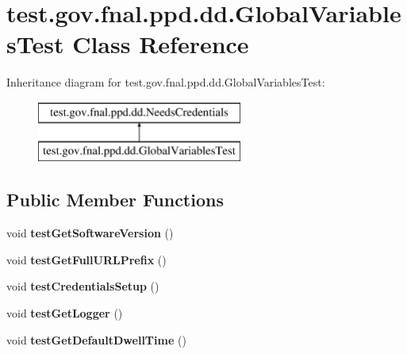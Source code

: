 \hypertarget{classtest_1_1gov_1_1fnal_1_1ppd_1_1dd_1_1GlobalVariablesTest}{\section{test.\-gov.\-fnal.\-ppd.\-dd.\-Global\-Variables\-Test Class Reference}
\label{classtest_1_1gov_1_1fnal_1_1ppd_1_1dd_1_1GlobalVariablesTest}
}
Inheritance diagram for test.\-gov.\-fnal.\-ppd.\-dd.\-Global\-Variables\-Test\-:\begin{figure}[H]
\begin{center}
\leavevmode
\includegraphics[height=2.000000cm]{classtest_1_1gov_1_1fnal_1_1ppd_1_1dd_1_1GlobalVariablesTest}
\end{center}
\end{figure}
\subsection*{Public Member Functions}
\begin{DoxyCompactItemize}
\item 
\hypertarget{classtest_1_1gov_1_1fnal_1_1ppd_1_1dd_1_1GlobalVariablesTest_a9d76ca535a3675f7691c271ec42a6661}{void {\bfseries test\-Get\-Software\-Version} ()}\label{classtest_1_1gov_1_1fnal_1_1ppd_1_1dd_1_1GlobalVariablesTest_a9d76ca535a3675f7691c271ec42a6661}

\item 
\hypertarget{classtest_1_1gov_1_1fnal_1_1ppd_1_1dd_1_1GlobalVariablesTest_a58e4e646a5b64a2e4416aa99a0e8e6f4}{void {\bfseries test\-Get\-Full\-U\-R\-L\-Prefix} ()}\label{classtest_1_1gov_1_1fnal_1_1ppd_1_1dd_1_1GlobalVariablesTest_a58e4e646a5b64a2e4416aa99a0e8e6f4}

\item 
\hypertarget{classtest_1_1gov_1_1fnal_1_1ppd_1_1dd_1_1GlobalVariablesTest_a4cc2ebdccd09fc82199a1619eb266526}{void {\bfseries test\-Credentials\-Setup} ()}\label{classtest_1_1gov_1_1fnal_1_1ppd_1_1dd_1_1GlobalVariablesTest_a4cc2ebdccd09fc82199a1619eb266526}

\item 
\hypertarget{classtest_1_1gov_1_1fnal_1_1ppd_1_1dd_1_1GlobalVariablesTest_aea79d292fb8176c765f6ec549ed37529}{void {\bfseries test\-Get\-Logger} ()}\label{classtest_1_1gov_1_1fnal_1_1ppd_1_1dd_1_1GlobalVariablesTest_aea79d292fb8176c765f6ec549ed37529}

\item 
\hypertarget{classtest_1_1gov_1_1fnal_1_1ppd_1_1dd_1_1GlobalVariablesTest_ae19faf852f1b8898c3c6914520550d12}{void {\bfseries test\-Get\-Default\-Dwell\-Time} ()}\label{classtest_1_1gov_1_1fnal_1_1ppd_1_1dd_1_1GlobalVariablesTest_ae19faf852f1b8898c3c6914520550d12}

\end{DoxyCompactItemize}
